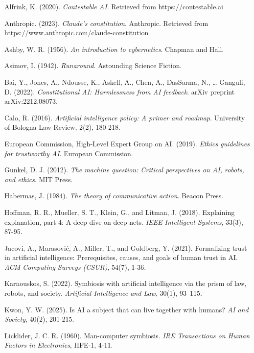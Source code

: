 \documentclass[12pt]{article}
\begin{document}
\begin{thebibliography}{99}

 Alfrink, K. (2020). \textit{Contestable AI}. Retrieved from https://contestable.ai

 Anthropic. (2023). \textit{Claude’s constitution}. Anthropic. Retrieved from https://www.anthropic.com/claude-constitution

 Ashby, W. R. (1956). \textit{An introduction to cybernetics}. Chapman and Hall.

 Asimov, I. (1942). \textit{Runaround}. Astounding Science Fiction.

 Bai, Y., Jones, A., Ndousse, K., Askell, A., Chen, A., DasSarma, N., … Ganguli, D. (2022). \textit{Constitutional AI: Harmlessness from AI feedback}. arXiv preprint arXiv:2212.08073.

 Calo, R. (2016). \textit{Artificial intelligence policy: A primer and roadmap}. University of Bologna Law Review, 2(2), 180-218.

 European Commission, High-Level Expert Group on AI. (2019). \textit{Ethics guidelines for trustworthy AI}. European Commission.

 Gunkel, D. J. (2012). \textit{The machine question: Critical perspectives on AI, robots, and ethics}. MIT Press.

 Habermas, J. (1984). \textit{The theory of communicative action}. Beacon Press.

 Hoffman, R. R., Mueller, S. T., Klein, G., and Litman, J. (2018). Explaining explanation, part 4: A deep dive on deep nets. \textit{IEEE Intelligent Systems}, 33(3), 87-95.

 Jacovi, A., Marasović, A., Miller, T., and Goldberg, Y. (2021). Formalizing trust in artificial intelligence: Prerequisites, causes, and goals of human trust in AI. \textit{ACM Computing Surveys (CSUR)}, 54(7), 1-36.

 Karnouskos, S. (2022). Symbiosis with artificial intelligence via the prism of law, robots, and society. \textit{Artificial Intelligence and Law}, 30(1), 93–115.

 Kwon, Y. W. (2025). Is AI a subject that can live together with humans? \textit{AI and Society}, 40(2), 201-215.

 Licklider, J. C. R. (1960). Man-computer symbiosis. \textit{IRE Transactions on Human Factors in Electronics}, HFE-1, 4-11.


\end{thebibliography}
\end{document}
